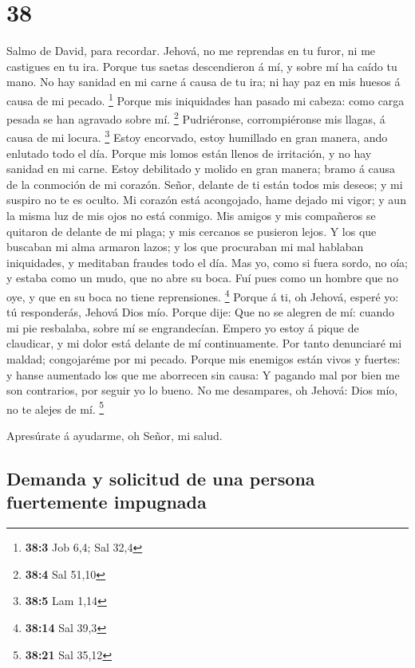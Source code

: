 \hypertarget{section-37}{%
\section{38}\label{section-37}}

 Salmo de David, para recordar. Jehová, no me reprendas en
tu furor, ni me castigues en tu ira.  Porque tus saetas
descendieron á mí, y sobre mí ha caído tu mano.  No hay
sanidad en mi carne á causa de tu ira; ni hay paz en mis huesos á causa
de mi pecado. \footnote{\textbf{38:3} Job 6,4; Sal 32,4} 
Porque mis iniquidades han pasado mi cabeza: como carga pesada se han
agravado sobre mí. \footnote{\textbf{38:4} Sal 51,10} 
Pudriéronse, corrompiéronse mis llagas, á causa de mi locura.
\footnote{\textbf{38:5} Lam 1,14}  Estoy encorvado, estoy
humillado en gran manera, ando enlutado todo el día.  Porque
mis lomos están llenos de irritación, y no hay sanidad en mi carne.
 Estoy debilitado y molido en gran manera; bramo á causa de
la conmoción de mi corazón.  Señor, delante de ti están
todos mis deseos; y mi suspiro no te es oculto.  Mi corazón
está acongojado, hame dejado mi vigor; y aun la misma luz de mis ojos no
está conmigo.  Mis amigos y mis compañeros se quitaron de
delante de mi plaga; y mis cercanos se pusieron lejos.  Y
los que buscaban mi alma armaron lazos; y los que procuraban mi mal
hablaban iniquidades, y meditaban fraudes todo el día.  Mas
yo, como si fuera sordo, no oía; y estaba como un mudo, que no abre su
boca.  Fuí pues como un hombre que no oye, y que en su boca
no tiene reprensiones. \footnote{\textbf{38:14} Sal 39,3} 
Porque á ti, oh Jehová, esperé yo: tú responderás, Jehová Dios mío.
 Porque dije: Que no se alegren de mí: cuando mi pie
resbalaba, sobre mí se engrandecían.  Empero yo estoy á
pique de claudicar, y mi dolor está delante de mí continuamente.
 Por tanto denunciaré mi maldad; congojaréme por mi pecado.
 Porque mis enemigos están vivos y fuertes: y hanse
aumentado los que me aborrecen sin causa:  Y pagando mal
por bien me son contrarios, por seguir yo lo bueno.  No me
desampares, oh Jehová: Dios mío, no te alejes de mí. \footnote{\textbf{38:21}
  Sal 35,12}

 Apresúrate á ayudarme, oh Señor, mi salud.

\hypertarget{demanda-y-solicitud-de-una-persona-fuertemente-impugnada}{%
\subsection{Demanda y solicitud de una persona fuertemente
impugnada}\label{demanda-y-solicitud-de-una-persona-fuertemente-impugnada}}

